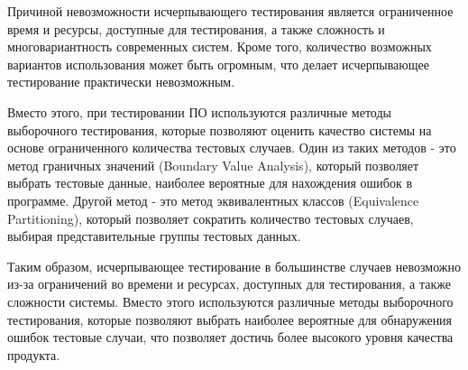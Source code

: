 Причиной невозможности исчерпывающего тестирования является ограниченное время и ресурсы, доступные для тестирования, а также сложность и многовариантность современных систем. Кроме того, количество возможных вариантов использования может быть огромным, что делает исчерпывающее тестирование практически невозможным.

Вместо этого, при тестировании ПО используются различные методы выборочного тестирования, которые позволяют оценить качество системы на основе ограниченного количества тестовых случаев. Один из таких методов - это метод граничных значений (Boundary Value Analysis), который позволяет выбрать тестовые данные, наиболее вероятные для нахождения ошибок в программе. Другой метод - это метод эквивалентных классов (Equivalence Partitioning), который позволяет сократить количество тестовых случаев, выбирая представительные группы тестовых данных.

Таким образом, исчерпывающее тестирование в большинстве случаев невозможно из-за ограничений во времени и ресурсах, доступных для тестирования, а также сложности системы. Вместо этого используются различные методы выборочного тестирования, которые позволяют выбрать наиболее вероятные для обнаружения ошибок тестовые случаи, что позволяет достичь более высокого уровня качества продукта.
